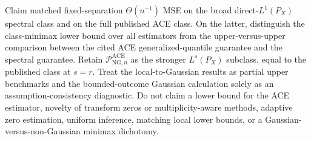 Claim matched fixed-separation \(\Theta(n^{-1})\) MSE on the broad direct-\(L^1(P_X)\) spectral class and on the full published ACE class. On the latter, distinguish the class-minimax lower bound over all estimators from the upper-versus-upper comparison between the cited ACE generalized-quantile guarantee and the spectral guarantee. Retain \(\mathcal P_{\mathrm{NG},n}^{\mathrm{ACE}}\) as the stronger \(L^s(P_X)\) subclass, equal to the published class at \(s=r\). Treat the local-to-Gaussian results as partial upper benchmarks and the bounded-outcome Gaussian calculation solely as an assumption-consistency diagnostic. Do not claim a lower bound for the ACE estimator, novelty of transform zeros or multiplicity-aware methods, adaptive zero estimation, uniform inference, matching local lower bounds, or a Gaussian-versus-non-Gaussian minimax dichotomy.